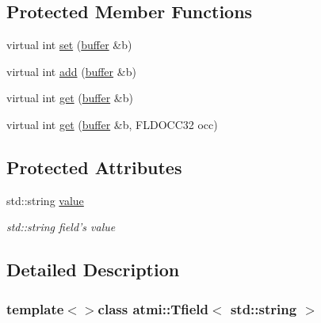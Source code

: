 \subsection*{Protected Member Functions}
\begin{DoxyCompactItemize}
\item 
virtual int \hyperlink{classatmi_1_1_tfield_3_01std_1_1string_01_4_a356a0e794a33bcfc1d3f4d8376e764d9}{set} (\hyperlink{classatmi_1_1buffer}{buffer} \&b)
\item 
virtual int \hyperlink{classatmi_1_1_tfield_3_01std_1_1string_01_4_af17fc3c22ce857f9d96f96d6c175b6d5}{add} (\hyperlink{classatmi_1_1buffer}{buffer} \&b)
\item 
virtual int \hyperlink{classatmi_1_1_tfield_3_01std_1_1string_01_4_afecf8218a3c312df34c36f334c995ac7}{get} (\hyperlink{classatmi_1_1buffer}{buffer} \&b)
\item 
virtual int \hyperlink{classatmi_1_1_tfield_3_01std_1_1string_01_4_a34f9956af4b0b98730595258e6c251e2}{get} (\hyperlink{classatmi_1_1buffer}{buffer} \&b, F\+L\+D\+O\+C\+C32 occ)
\end{DoxyCompactItemize}
\subsection*{Protected Attributes}
\begin{DoxyCompactItemize}
\item 
\hypertarget{classatmi_1_1_tfield_3_01std_1_1string_01_4_a72f9f25116c479ad4c6b5d806f97606d}{std\+::string \hyperlink{classatmi_1_1_tfield_3_01std_1_1string_01_4_a72f9f25116c479ad4c6b5d806f97606d}{value}}\label{classatmi_1_1_tfield_3_01std_1_1string_01_4_a72f9f25116c479ad4c6b5d806f97606d}

\begin{DoxyCompactList}\small\item\em std\+::string field's value \end{DoxyCompactList}\end{DoxyCompactItemize}


\subsection{Detailed Description}
\subsubsection*{template$<$$>$class atmi\+::\+Tfield$<$ std\+::string $>$}



